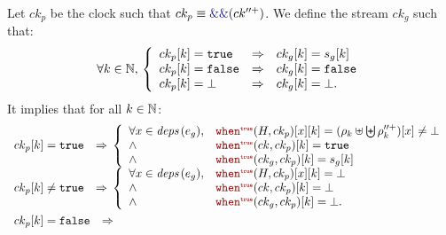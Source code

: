 \begin{skippableproof}
    Let $ck_p$ be the clock such that $ck_p \equiv \kwf{\&\&}(ck^{\prime\prime+})$. We define the
    stream $ck_g$ such that:
    \begin{equation*}
        \forall k \in \mathbb{N}, \,
        \left\{
        \begin{array}{lll}
            ck_p[k] = \mathtt{{true}}  & \Rightarrow & ck_g[k] = s_g[k] \\
            ck_p[k] = \mathtt{{false}} & \Rightarrow & ck_g[k] = \mathtt{{false}} \\
            ck_p[k] = \bot   & \Rightarrow & ck_g[k] = \bot.  \\
        \end{array}
        \right.
    \end{equation*}
    It implies that for all $k \in \mathbb{N}$:
    \begin{align}
         & \begin{array}{ll}
               ck_p[k] = \true    & \Rightarrow \,
               \left\{
               \begin{array}{ll}
                \forall x \in \deps{e_g}, & \whenT{H}{ck_p}[x][k] =
                (\rho_k \ctxconcat \bigCtxconcat \rho^{\prime\prime+}_k)[x] \neq \bot \\
                \wedge                    & \whenT{ck}{ck_p}[k] = \true               \\
                \wedge                    & \whenT{ck_g}{ck_p}[k] = s_g[k]            \\
            \end{array}
               \right.                             \\
               ck_p[k] \neq \true & \Rightarrow \,
               \left\{
               \begin{array}{ll}
                \forall x \in \deps{e_g}, & \whenT{H}{ck_p}[x][k] = \bot  \\
                \wedge                    & \whenT{ck}{ck_p}[k] = \bot    \\
                \wedge                    & \whenT{ck_g}{ck_p}[k] = \bot. \\
            \end{array}
               \right.                             \\
           \end{array} \label{eq:semantics:grsync:theorems:equivalence:epats:whenT} \\
         & \begin{array}{ll}
               ck_p[k] = \false    & \Rightarrow \,

\end{array}
\end{align}
\end{skippableproof}
